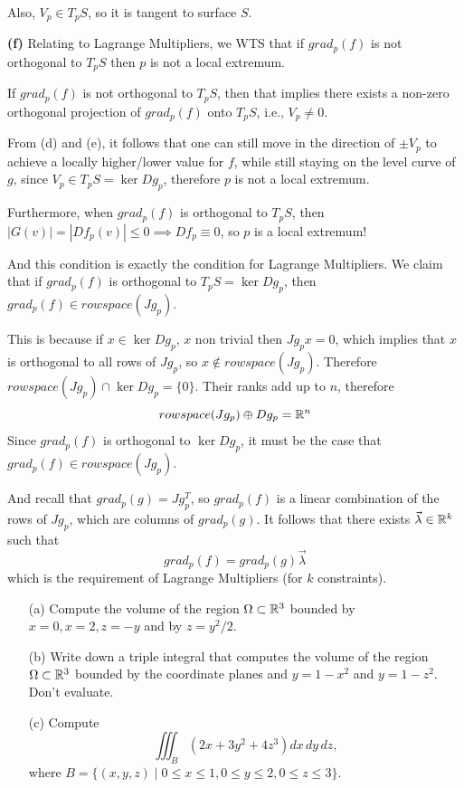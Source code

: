 \documentclass[a4paper, 12pt]{article}
\begin{document}
\begin{solution}
    Also, $V_p \in T_p S$, so it is tangent to surface $S$.

    \textbf{(f)} Relating to Lagrange Multipliers, we WTS that if $grad_p (f)$ is not orthogonal to $T_p S$ then $p$ is not a local extremum.

    If $grad_p(f)$ is not orthogonal to $T_p S$, then that implies there exists a non-zero orthogonal projection of $grad_p(f)$ onto $T_p S$, i.e., $V_p \neq 0$. 

    From (d) and (e), it follows that one can still move in the direction of $\pm V_p$ to achieve a locally higher/lower value for $f$, while still staying on the level curve of $g$, since $V_p \in T_p S = \ker Dg_p$, therefore $p$ is not a local extremum.

    Furthermore, when $grad_p (f)$ is orthogonal to $T_p S$, then $|G(v)| = |Df_p(v)| \leq 0 \implies Df_p \equiv 0$, so $p$ is a local extremum!

    And this condition is exactly the condition for Lagrange Multipliers. We claim that if $grad_p (f) $ is orthogonal to $T_p S = \ker Dg_p$, then $grad_p (f) \in rowspace (Jg_p)$.
    
    This is because if $x \in \ker Dg_p$, $x$ non trivial then $Jg_p x = 0$, which implies that $x$ is orthogonal to all rows of $Jg_p$, so $x \not \in rowspace (Jg_p)$. Therefore $rowspace(Jg_p) \cap \ker Dg_p = \{0\}$. Their ranks add up to $n$, therefore 
     \[
        rowspace(Jg_p) \oplus Dg_p = \mathbb{R}^n
    \]
    Since $grad_p(f)$ is orthogonal to $\ker Dg_p$, it must be the case that $grad_p(f) \in rowspace(Jg_p)$.

    And recall that $grad_p (g) = Jg_p^T$, so $grad_p(f)$ is a linear combination of the rows of $Jg_p$, which are columns of $grad_p(g)$. It follows that there exists $\vec{\lambda} \in \mathbb{R}^k$ such that \[
    grad_p(f) = grad_p(g) \vec{\lambda}
    \]
    which is the requirement of Lagrange Multipliers (for $k$ constraints).
\end{solution}

\begin{problem} 
\mbox{}
\begin{enumerate}
    \item[(a)] Compute the volume of the region $\Omega\subset \mathbb{R}^3$  bounded by $x=0, x=2, z=-y$  and by $z=y^2 / 2$.
    \item[(b)] Write down a triple integral that computes the volume of the  region $\Omega\subset \mathbb{R}^3$  bounded by  the coordinate planes and  $y=1-x^2$ and $y=1-z^2$.  Don't evaluate.
    \item[(c)] Compute \[\iiint_B\left(2 x+3 y^2+4 z^3\right) d x\,dy\,dz,\]
        where  $B=\{(x, y, z) \mid 0 \leq x \leq 1,0 \leq y \leq 2,0 \leq z \leq 3\}$.
\end{enumerate}
\end{problem}
\end{document}
